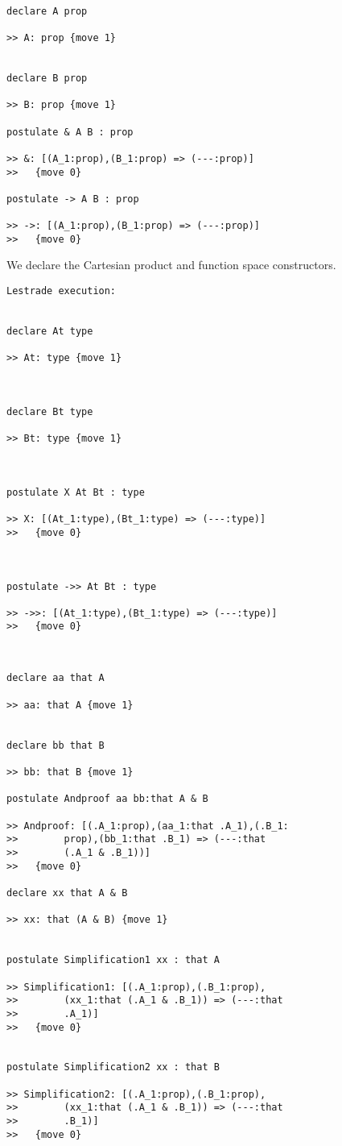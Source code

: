 \documentclass[12pt]{article}
\begin{document}
  \begin{verbatim}

declare A prop

>> A: prop {move 1}


declare B prop

>> B: prop {move 1}

postulate & A B : prop

>> &: [(A_1:prop),(B_1:prop) => (---:prop)]
>>   {move 0}

postulate -> A B : prop

>> ->: [(A_1:prop),(B_1:prop) => (---:prop)]
>>   {move 0}

\end{verbatim}

We declare the Cartesian product and function space constructors.

\begin{verbatim}Lestrade execution:


declare At type

>> At: type {move 1}



declare Bt type

>> Bt: type {move 1}



postulate X At Bt : type

>> X: [(At_1:type),(Bt_1:type) => (---:type)]
>>   {move 0}



postulate ->> At Bt : type

>> ->>: [(At_1:type),(Bt_1:type) => (---:type)]
>>   {move 0}


\end{verbatim}

  \begin{verbatim}

declare aa that A

>> aa: that A {move 1}


declare bb that B

>> bb: that B {move 1}

postulate Andproof aa bb:that A & B

>> Andproof: [(.A_1:prop),(aa_1:that .A_1),(.B_1:
>>        prop),(bb_1:that .B_1) => (---:that 
>>        (.A_1 & .B_1))]
>>   {move 0}

declare xx that A & B

>> xx: that (A & B) {move 1}


postulate Simplification1 xx : that A

>> Simplification1: [(.A_1:prop),(.B_1:prop),
>>        (xx_1:that (.A_1 & .B_1)) => (---:that 
>>        .A_1)]
>>   {move 0}


postulate Simplification2 xx : that B

>> Simplification2: [(.A_1:prop),(.B_1:prop),
>>        (xx_1:that (.A_1 & .B_1)) => (---:that 
>>        .B_1)]
>>   {move 0}

\end{verbatim}
\end{document}
